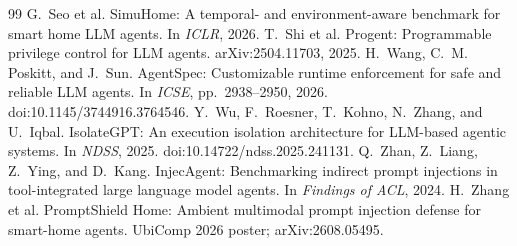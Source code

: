 \documentclass[11pt]{article}
\begin{document}
\begin{thebibliography}{99}
 G.~Seo et al. SimuHome: A temporal- and environment-aware benchmark for smart home LLM agents. In \emph{ICLR}, 2026.
 T.~Shi et al. Progent: Programmable privilege control for LLM agents. arXiv:2504.11703, 2025.
 H.~Wang, C.~M. Poskitt, and J.~Sun. AgentSpec: Customizable runtime enforcement for safe and reliable LLM agents. In \emph{ICSE}, pp.~2938--2950, 2026. doi:10.1145/3744916.3764546.
 Y.~Wu, F.~Roesner, T.~Kohno, N.~Zhang, and U.~Iqbal. IsolateGPT: An execution isolation architecture for LLM-based agentic systems. In \emph{NDSS}, 2025. doi:10.14722/ndss.2025.241131.
 Q.~Zhan, Z.~Liang, Z.~Ying, and D.~Kang. InjecAgent: Benchmarking indirect prompt injections in tool-integrated large language model agents. In \emph{Findings of ACL}, 2024.
 H.~Zhang et al. PromptShield Home: Ambient multimodal prompt injection defense for smart-home agents. UbiComp 2026 poster; arXiv:2608.05495.
\end{thebibliography}
\end{document}

